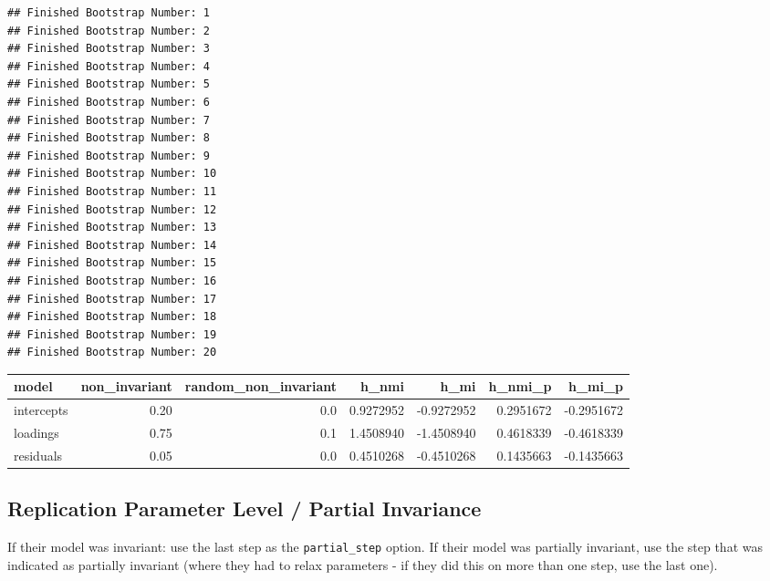 \documentclass[
  man]{apa7}
\begin{document}
\begin{verbatim}
## Finished Bootstrap Number: 1
## Finished Bootstrap Number: 2
## Finished Bootstrap Number: 3
## Finished Bootstrap Number: 4
## Finished Bootstrap Number: 5
## Finished Bootstrap Number: 6
## Finished Bootstrap Number: 7
## Finished Bootstrap Number: 8
## Finished Bootstrap Number: 9
## Finished Bootstrap Number: 10
## Finished Bootstrap Number: 11
## Finished Bootstrap Number: 12
## Finished Bootstrap Number: 13
## Finished Bootstrap Number: 14
## Finished Bootstrap Number: 15
## Finished Bootstrap Number: 16
## Finished Bootstrap Number: 17
## Finished Bootstrap Number: 18
## Finished Bootstrap Number: 19
## Finished Bootstrap Number: 20
\end{verbatim}

\begin{tabular}{l|r|r|r|r|r|r}
\hline
model & non\_invariant & random\_non\_invariant & h\_nmi & h\_mi & h\_nmi\_p & h\_mi\_p\\
\hline
intercepts & 0.20 & 0.0 & 0.9272952 & -0.9272952 & 0.2951672 & -0.2951672\\
\hline
loadings & 0.75 & 0.1 & 1.4508940 & -1.4508940 & 0.4618339 & -0.4618339\\
\hline
residuals & 0.05 & 0.0 & 0.4510268 & -0.4510268 & 0.1435663 & -0.1435663\\
\hline
\end{tabular}

\hypertarget{replication-parameter-level-partial-invariance}{%
\subsection{Replication Parameter Level / Partial Invariance}\label{replication-parameter-level-partial-invariance}}

If their model was invariant: use the last step as the \texttt{partial\_step} option. If their model was partially invariant, use the step that was indicated as partially invariant (where they had to relax parameters - if they did this on more than one step, use the last one).
\end{document}
